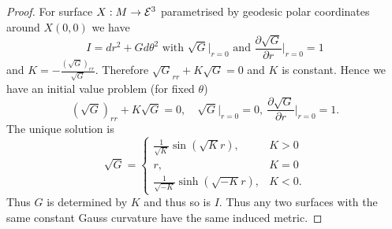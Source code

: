 \begin{proof}
	For surface $X: M \to \mathcal E^3$ parametrised by geodesic polar coordinates around $X(0,0)$ we have
		\[ I=dr^2+Gd\theta^2 \text{ with }
			\sqrt G \big|_{r=0} \text{ and } \frac {\partial \sqrt G}{\partial r} \big|_{r=0}=1\]
	and $K=-\frac {(\sqrt G)_{rr}}{\sqrt G}$.
	Therefore $\sqrt G_{rr}+K\sqrt G = 0$ and $K$ is constant.
	Hence we have an initial value problem (for fixed $\theta$)
		\[ (\sqrt G)_{rr} + K\sqrt G=0, \quad \sqrt G\big|_{r=0}=0, \ \frac {\partial \sqrt G}{\partial r} \big|_{r=0}=1.  \]
	The unique solution is
		\[ \sqrt G= \begin{cases}
			\frac 1{\sqrt K} \sin(\sqrt K r), & K>0\\
			r, & K=0\\
			\frac 1{\sqrt{-K}} \sinh(\sqrt{-K}r), & K<0.
		\end{cases} \]
	Thus $G$ is determined by $K$ and thus so is $I$. Thus any two surfaces with the same constant Gauss curvature have the same induced metric.

\end{proof}